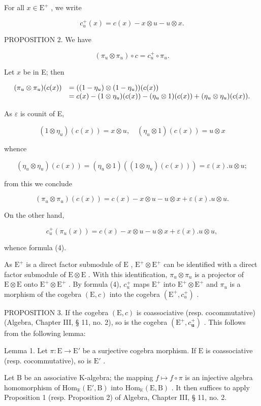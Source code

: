 For all \(x \in \mathrm{E}^{+}\) , we write

\[
c _ {u} ^ {+} (x) = c (x) - x \otimes u - u \otimes x.\tag{3}
\]

PROPOSITION 2. We have

\[
\left(\pi_ {u} \otimes \pi_ {u}\right) \circ c = c _ {u} ^ {+} \circ \pi_ {u}.\tag{4}
\]

Let \(x\) be in E; then

\[
\begin{array}{r l} (\pi_ {u} \otimes \pi_ {u}) (c (x)) & = ((1 - \eta_ {u}) \otimes (1 - \eta_ {u})) (c (x)) \\ & = c (x) - (1 \otimes \eta_ {u}) (c (x)) - (\eta_ {u} \otimes 1) (c (x)) + (\eta_ {u} \otimes \eta_ {u}) (c (x)). \end{array}
\]

As \(\varepsilon\) is counit of E,

\[
(1 \otimes \eta_ {u}) (c (x)) = x \otimes u, \quad (\eta_ {u} \otimes 1) (c (x)) = u \otimes x
\]

whence

\[
\left(\eta_ {u} \otimes \eta_ {u}\right) (c (x)) = \left(\eta_ {u} \otimes 1\right) \left(\left(1 \otimes \eta_ {u}\right) (c (x))\right) = \varepsilon (x). u \otimes u;
\]

from this we conclude

\[
\left(\pi_ {u} \otimes \pi_ {u}\right) (c (x)) = c (x) - x \otimes u - u \otimes x + \varepsilon (x). u \otimes u.
\]

On the other hand,

\[
c _ {u} ^ {+} \left(\pi_ {u} (x)\right) = c (x) - x \otimes u - u \otimes x + \varepsilon (x). u \otimes u,
\]

whence formula (4).

As \(\mathrm{E}^{+}\) is a direct factor submodule of \(\mathrm{E}\) , \(\mathrm{E}^{+} \otimes \mathrm{E}^{+}\) can be identified with a direct factor submodule of \(\mathrm{E} \otimes \mathrm{E}\) . With this identification, \(\pi_{u} \otimes \pi_{u}\) is a projector of \(\mathrm{E} \otimes \mathrm{E}\) onto \(\mathrm{E}^{+} \otimes \mathrm{E}^{+}\) . By formula (4), \(c_{u}^{+}\) maps \(\mathrm{E}^{+}\) into \(\mathrm{E}^{+} \otimes \mathrm{E}^{+}\) and \(\pi_{u}\) is a morphism of the cogebra \((\mathrm{E}, c)\) into the cogebra \((\mathrm{E}^{+}, c_{u}^{+})\) .

PROPOSITION 3. If the cogebra \((\mathrm{E}, c)\) is coassociative (resp. cocommutative) (Algebra, Chapter III, § 11, no. 2), so is the cogebra \((\mathrm{E}^{+}, c_{\mathbf{u}}^{+})\) . This follows from the following lemma:

Lemma 1. Let \(\pi: \mathrm{E} \to \mathrm{E}'\) be a surjective cogebra morphism. If \(\mathrm{E}\) is coassociative (resp. cocommutative), so is \(\mathrm{E}'\) .

Let B be an associative K-algebra; the mapping \(f \mapsto f \circ \pi\) is an injective algebra homomorphism of \(\mathrm{Hom}_{\mathbb{K}}(\mathrm{E}', \mathrm{B})\) into \(\mathrm{Hom}_{\mathbb{K}}(\mathrm{E}, \mathrm{B})\) . It then suffices to apply Proposition 1 (resp. Proposition 2) of Algebra, Chapter III, § 11, no. 2.

